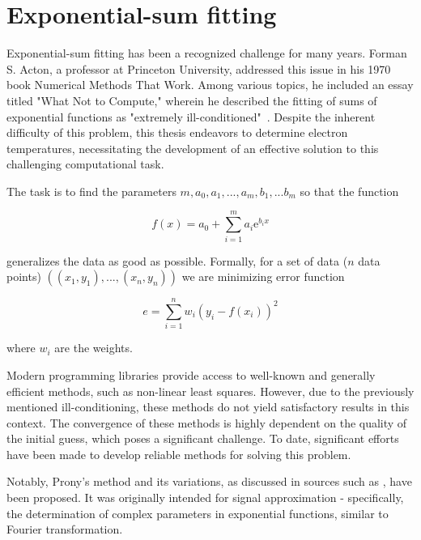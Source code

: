 \section{Exponential-sum fitting}
\label{sec:exp-fit}
Exponential-sum fitting has been a recognized challenge for many years. Forman S. Acton, a professor at Princeton University, addressed this issue in his 1970 book Numerical Methods That Work. Among various topics, he included an essay titled "What Not to Compute," wherein he described the fitting of sums of exponential functions as "extremely ill-conditioned"~\cite{acton}. Despite the inherent difficulty of this problem, this thesis endeavors to determine electron temperatures, necessitating the development of an effective solution to this challenging computational task. 

The task is to find the parameters $m, a_0, a_1,..., a_m, b_1,...b_m$ so that the function

\begin{equation}
	f(x) = a_0 + \sum_{i=1}^{m} a_i \mathrm{e}^{b_i x}
\end{equation}

generalizes the data as good as possible. Formally, for a set of data ($n$ data points) $\left(\left(x_1,y_1\right),..., \left(x_n,y_n\right)\right)$ we are minimizing error function

\begin{equation}
	e = \sum_{i=1}^{n}w_i(y_i-f(x_i))^2
\end{equation}

where $w_i$ are the weights.

Modern programming libraries provide access to well-known and generally efficient methods, such as non-linear least squares. However, due to the previously mentioned ill-conditioning, these methods do not yield satisfactory results in this context. The convergence of these methods is highly dependent on the quality of the initial guess, which poses a significant challenge. To date, significant efforts have been made to develop reliable methods for solving this problem. 

Notably, Prony's method \cite{prony} and its variations, as discussed in sources such as \cite{prony2}, have been proposed. It was originally intended for signal approximation - specifically, the determination of complex parameters in exponential functions, similar to Fourier transformation.

